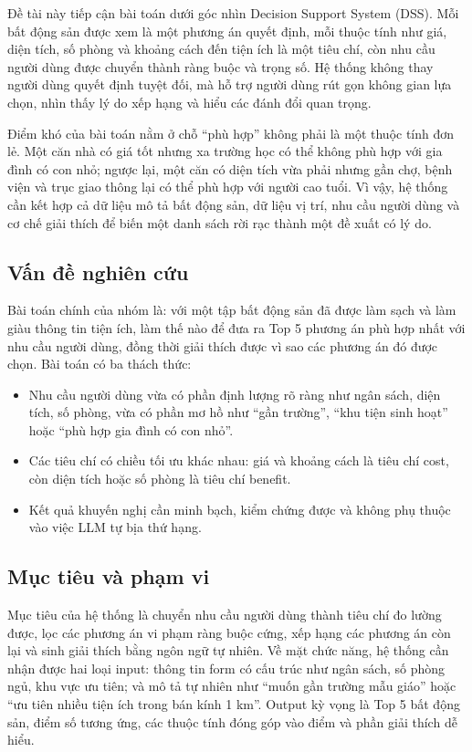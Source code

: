 \documentclass[a4paper,12pt]{article}
\begin{document}
Đề tài này tiếp cận bài toán dưới góc nhìn Decision Support System (DSS). Mỗi bất động sản được xem là một phương án quyết định, mỗi thuộc tính như giá, diện tích, số phòng và khoảng cách đến tiện ích là một tiêu chí, còn nhu cầu người dùng được chuyển thành ràng buộc và trọng số. Hệ thống không thay người dùng quyết định tuyệt đối, mà hỗ trợ người dùng rút gọn không gian lựa chọn, nhìn thấy lý do xếp hạng và hiểu các đánh đổi quan trọng.

Điểm khó của bài toán nằm ở chỗ ``phù hợp'' không phải là một thuộc tính đơn lẻ. Một căn nhà có giá tốt nhưng xa trường học có thể không phù hợp với gia đình có con nhỏ; ngược lại, một căn có diện tích vừa phải nhưng gần chợ, bệnh viện và trục giao thông lại có thể phù hợp với người cao tuổi. Vì vậy, hệ thống cần kết hợp cả dữ liệu mô tả bất động sản, dữ liệu vị trí, nhu cầu người dùng và cơ chế giải thích để biến một danh sách rời rạc thành một đề xuất có lý do.

\subsection{Vấn đề nghiên cứu}
Bài toán chính của nhóm là: với một tập bất động sản đã được làm sạch và làm giàu thông tin tiện ích, làm thế nào để đưa ra Top 5 phương án phù hợp nhất với nhu cầu người dùng, đồng thời giải thích được vì sao các phương án đó được chọn. Bài toán có ba thách thức:

\begin{itemize}
    \item Nhu cầu người dùng vừa có phần định lượng rõ ràng như ngân sách, diện tích, số phòng, vừa có phần mơ hồ như ``gần trường'', ``khu tiện sinh hoạt'' hoặc ``phù hợp gia đình có con nhỏ''.
    \item Các tiêu chí có chiều tối ưu khác nhau: giá và khoảng cách là tiêu chí cost, còn diện tích hoặc số phòng là tiêu chí benefit.
    \item Kết quả khuyến nghị cần minh bạch, kiểm chứng được và không phụ thuộc vào việc LLM tự bịa thứ hạng.
\end{itemize}

\subsection{Mục tiêu và phạm vi}
Mục tiêu của hệ thống là chuyển nhu cầu người dùng thành tiêu chí đo lường được, lọc các phương án vi phạm ràng buộc cứng, xếp hạng các phương án còn lại và sinh giải thích bằng ngôn ngữ tự nhiên. Về mặt chức năng, hệ thống cần nhận được hai loại input: thông tin form có cấu trúc như ngân sách, số phòng ngủ, khu vực ưu tiên; và mô tả tự nhiên như ``muốn gần trường mẫu giáo'' hoặc ``ưu tiên nhiều tiện ích trong bán kính 1 km''. Output kỳ vọng là Top 5 bất động sản, điểm số tương ứng, các thuộc tính đóng góp vào điểm và phần giải thích dễ hiểu.
\end{document}
